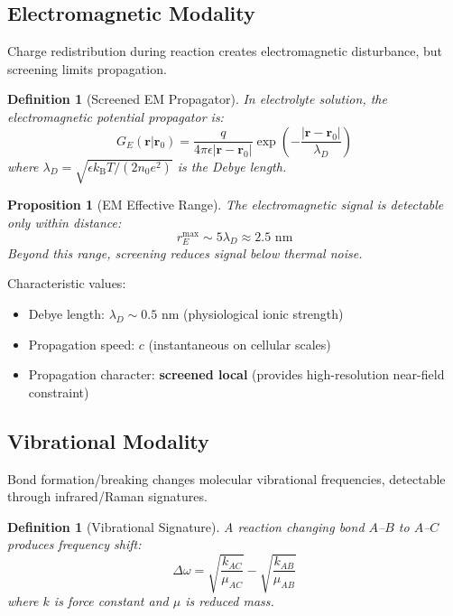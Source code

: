 \documentclass[11pt,a4paper]{article}
\newtheorem{definition}[theorem]{Definition}
\newtheorem{proposition}[theorem]{Proposition}
\theoremstyle{remark}
\newcommand{\kB}{k_{\mathrm{B}}}
\newcommand{\rxnpos}{\mathbf{r}_0}
\begin{document}
\subsection{Electromagnetic Modality}

Charge redistribution during reaction creates electromagnetic disturbance, but screening limits propagation.

\begin{definition}[Screened EM Propagator]
In electrolyte solution, the electromagnetic potential propagator is:
\begin{equation}
    G_E(\mathbf{r} | \rxnpos) = \frac{q}{4\pi\epsilon |\mathbf{r} - \rxnpos|} \exp\left(-\frac{|\mathbf{r} - \rxnpos|}{\lambda_D}\right)
\end{equation}
where $\lambda_D = \sqrt{\epsilon \kB T / (2 n_0 e^2)}$ is the Debye length.
\end{definition}

\begin{proposition}[EM Effective Range]
\label{prop:em_range}
The electromagnetic signal is detectable only within distance:
\begin{equation}
    r_E^{\max} \sim 5\lambda_D \approx 2.5 \text{ nm}
\end{equation}
Beyond this range, screening reduces signal below thermal noise.
\end{proposition}

Characteristic values:
\begin{itemize}
    \item Debye length: $\lambda_D \sim 0.5$ nm (physiological ionic strength)
    \item Propagation speed: $c$ (instantaneous on cellular scales)
    \item Propagation character: \textbf{screened local} (provides high-resolution near-field constraint)
\end{itemize}

\subsection{Vibrational Modality}

Bond formation/breaking changes molecular vibrational frequencies, detectable through infrared/Raman signatures.

\begin{definition}[Vibrational Signature]
A reaction changing bond $A$--$B$ to $A$--$C$ produces frequency shift:
\begin{equation}
    \Delta\omega = \sqrt{\frac{k_{AC}}{\mu_{AC}}} - \sqrt{\frac{k_{AB}}{\mu_{AB}}}
\end{equation}
where $k$ is force constant and $\mu$ is reduced mass.
\end{definition}
\end{document}
